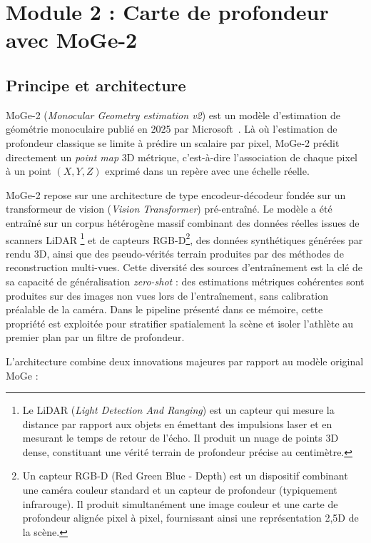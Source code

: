 \section{Module 2 : Carte de profondeur avec MoGe-2} \label{sec:module-2}

\subsection{Principe et architecture}

MoGe-2 (\emph{Monocular Geometry estimation v2}) est un modèle d'estimation de géométrie monoculaire publié en 2025 par Microsoft~\cite{MoGe2-2025}. Là où l'estimation de profondeur classique se limite à prédire un scalaire par pixel, MoGe-2 prédit directement un \emph{point map} 3D métrique, c'est-à-dire l'association de chaque pixel à un point $(X, Y, Z)$ exprimé dans un repère avec une échelle réelle.

MoGe-2 repose sur une architecture de type encodeur-décodeur fondée sur un transformeur de vision (\textit{Vision Transformer}) pré-entraîné. Le modèle a été entraîné sur un corpus hétérogène massif combinant des données réelles issues de scanners LiDAR \footnote{Le LiDAR (\emph{Light Detection And Ranging}) est un capteur qui mesure la distance par rapport aux objets en émettant des impulsions laser et en mesurant le temps de retour de l'écho. Il produit un nuage de points 3D dense, constituant une vérité terrain de profondeur précise au centimètre.} et de capteurs RGB-D\footnote{Un capteur RGB-D (Red Green Blue - Depth) est un dispositif combinant une caméra couleur standard et un capteur de profondeur (typiquement infrarouge). Il produit simultanément une image couleur et une carte de profondeur alignée pixel à pixel, fournissant ainsi une représentation 2,5D de la scène.}, des données synthétiques générées par rendu 3D, ainsi que des pseudo-vérités terrain produites par des méthodes de reconstruction multi-vues. Cette diversité des sources d'entraînement est la clé de sa capacité de généralisation \textit{zero-shot} : des estimations métriques cohérentes sont produites sur des images non vues lors de l'entraînement, sans calibration préalable de la caméra. Dans le pipeline présenté dans ce mémoire, cette propriété est exploitée pour stratifier spatialement la scène et isoler l'athlète au premier plan par un filtre de profondeur.

L'architecture combine deux innovations majeures par rapport au modèle original MoGe :

